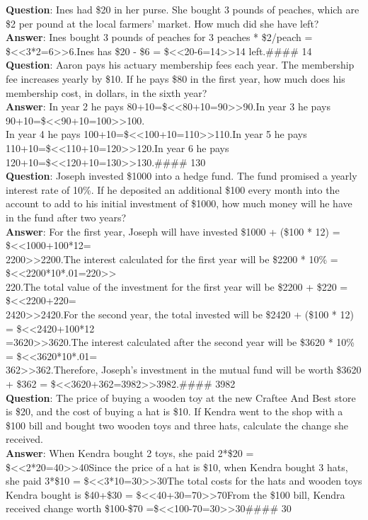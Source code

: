 \textbf{Question}: Ines had \$20 in her purse. She bought 3 pounds of peaches, which are \$2 per pound at the local farmers’ market. How much did she have left?\\
\textbf{Answer}: Ines bought 3 pounds of peaches for 3 peaches * \$2/peach = \$<<3*2=6>>6.Ines has \$20 - \$6 = \$<<20-6=14>>14 left.\#\#\#\# 14\\
\textbf{Question}: Aaron pays his actuary membership fees each year. The membership fee increases yearly by \$10. If he pays \$80 in the first year, how much does his membership cost, in dollars, in the sixth year?\\
\textbf{Answer}: In year 2 he pays 80+10=\$<<80+10=90>>90.In year 3 he pays 90+10=\$<<90+10=100>>100.\\
In year 4 he pays 100+10=\$<<100+10=110>>110.In year 5 he pays 110+10=\$<<110+10=120>>120.In year 6 he pays 120+10=\$<<120+10=130>>130.\#\#\#\# 130\\
\textbf{Question}: Joseph invested \$1000 into a hedge fund. The fund promised a yearly interest rate of 10\%. If he deposited an additional \$100 every month into the account to add to his initial investment of \$1000, how much money will he have in the fund after two years?\\
\textbf{Answer}: For the first year, Joseph will have invested \$1000 + (\$100 * 12) = \$<<1000+100*12=\\
2200>>2200.The interest calculated for the first year will be \$2200 * 10\% = \$<<2200*10*.01=220>>\\
220.The total value of the investment for the first year will be \$2200 + \$220 = \$<<2200+220=\\
2420>>2420.For the second year, the total invested will be \$2420 + (\$100 * 12) = \$<<2420+100*12\\
=3620>>3620.The interest calculated after the second year will be \$3620 * 10\% = \$<<3620*10*.01=\\
362>>362.Therefore, Joseph's investment in the mutual fund will be worth \$3620 + \$362 = \$<<3620+362=3982>>3982.\#\#\#\# 3982\\
\textbf{Question}: The price of buying a wooden toy at the new Craftee And Best store is \$20, and the cost of buying a hat is \$10. If Kendra went to the shop with a \$100 bill and bought two wooden toys and three hats, calculate the change she received.\\
\textbf{Answer}: When Kendra bought 2 toys, she paid 2*\$20 = \$<<2*20=40>>40Since the price of a hat is \$10, when Kendra bought 3 hats, she paid 3*\$10 = \$<<3*10=30>>30The total costs for the hats and wooden toys Kendra bought is \$40+\$30 = \$<<40+30=70>>70From the \$100 bill, Kendra received change worth \$100-\$70 =\$<<100-70=30>>30\#\#\#\# 30\\

